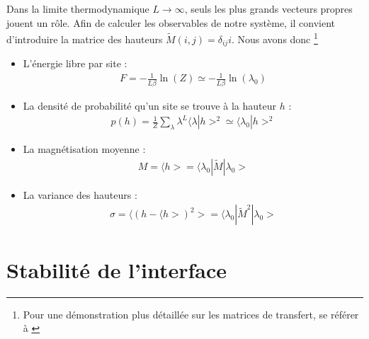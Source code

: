 Dans la limite thermodynamique $L \to \infty$, seuls les plus grands vecteurs propres jouent un rôle. Afin de calculer les observables de notre système, il convient d'introduire la matrice des hauteurs $\tilde{M}(i,j) = \delta_{ij} i$. Nous avons donc \footnote{Pour une démonstration plus détaillée sur les matrices de transfert, se référer à \cite{matrice_transfert}}
\begin{itemize}
	\item L'énergie libre par site :  
	\begin{align}
		F =  - \frac{1}{L \beta} \ln(Z) \simeq - \frac{1}{L \beta } \ln( \lambda_0)
	\end{align}
	\item La densité de probabilité qu'un site se trouve à la hauteur $h$ : 
	\begin{align}
		p(h) = \frac{1}{Z} \sum_\lambda \lambda^L \langle\lambda | h >^2 \simeq \langle \lambda_0 | h >^2
	\end{align}
	\item La magnétisation moyenne :
	\begin{align}
		M = \langle h > = \langle \lambda_0 | \tilde{M} | \lambda_0 > 
	\end{align}
	\item La variance des hauteurs :
	\begin{align}
		\sigma = \langle (h - \langle h >)^2 > =  \langle \lambda_0 | \tilde{M}^2 | \lambda_0 >
	\end{align}
\end{itemize}

	\section{Stabilité de l'interface}

